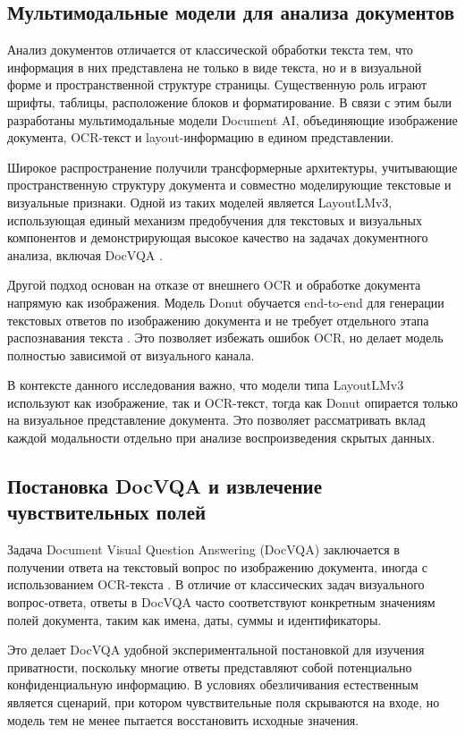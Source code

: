 \documentclass[a4paper,12pt]{extarticle}
\begin{document}
\subsection{Мультимодальные модели для анализа документов}

Анализ документов отличается от классической обработки текста тем, что информация в них представлена не только в виде текста, но и в визуальной форме и пространственной структуре страницы. Существенную роль играют шрифты, таблицы, расположение блоков и форматирование. В связи с этим были разработаны мультимодальные модели Document AI, объединяющие изображение документа, OCR-текст и layout-информацию в едином представлении.

Широкое распространение получили трансформерные архитектуры, учитывающие пространственную структуру документа и совместно моделирующие текстовые и визуальные признаки. Одной из таких моделей является LayoutLMv3, использующая единый механизм предобучения для текстовых и визуальных компонентов и демонстрирующая высокое качество на задачах документного анализа, включая DocVQA \cite{layoutlmv3} .

Другой подход основан на отказе от внешнего OCR и обработке документа напрямую как изображения. Модель Donut обучается end-to-end для генерации текстовых ответов по изображению документа и не требует отдельного этапа распознавания текста \cite{donut}. Это позволяет избежать ошибок OCR, но делает модель полностью зависимой от визуального канала.

В контексте данного исследования важно, что модели типа LayoutLMv3 используют как изображение, так и OCR-текст, тогда как Donut опирается только на визуальное представление документа. Это позволяет рассматривать вклад каждой модальности отдельно при анализе воспроизведения скрытых данных.

\subsection{Постановка DocVQA и извлечение чувствительных полей}

Задача Document Visual Question Answering (DocVQA) заключается в получении ответа на текстовый вопрос по изображению документа, иногда с использованием OCR-текста \cite{docvqa}. В отличие от классических задач визуального вопрос-ответа, ответы в DocVQA часто соответствуют конкретным значениям полей документа, таким как имена, даты, суммы и идентификаторы.

Это делает DocVQA удобной экспериментальной постановкой для изучения приватности, поскольку многие ответы представляют собой потенциально конфиденциальную информацию. В условиях обезличивания естественным является сценарий, при котором чувствительные поля скрываются на входе, но модель тем не менее пытается восстановить исходные значения.
\end{document}
